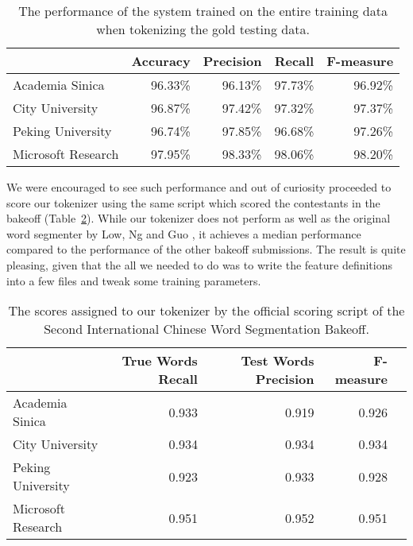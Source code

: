 \begin{table}
  \begin{center}
    \begin{tabular}{ | l | r | r | r | r | }
      \hline
      & Accuracy & Precision & Recall & F-measure \\ \hline
      Academia Sinica & 96.33\% & 96.13\% & 97.73\% & 96.92\% \\ \hline
      City University & 96.87\% & 97.42\% & 97.32\% & 97.37\% \\ \hline
      Peking University & 96.74\% & 97.85\% & 96.68\% & 97.26\% \\ \hline
      Microsoft Research & 97.95\% & 98.33\% & 98.06\% & 98.20\% \\
      \hline
    \end{tabular}
  \end{center}
  \caption[Final performance of Chinese segmenter]
    {The performance of the system trained on the entire training data when
     tokenizing the gold testing data.}
  \label{tbl:bakeoff-final}
\end{table}


We were encouraged to see such performance and out of curiosity proceeded to
score our tokenizer using the same script which scored the contestants in the
bakeoff (Table~\ref{tbl:bakeoff-score}). While our tokenizer does not perform
as well as the original word segmenter by Low, Ng and Guo
\cite{seg-chinese-maxent}, it achieves a median performance compared to the
performance of the other bakeoff submissions. The result is quite pleasing,
given that the all we needed to do was to write the feature definitions into a
few files and tweak some training parameters.

\begin{table}
  \begin{center}
    \begin{tabular}{ | l | r | r | r | r | }
      \hline
      & True Words Recall & Test Words Precision & F-measure \\ \hline
      Academia Sinica & 0.933 & 0.919 & 0.926 \\ \hline
      City University & 0.934 & 0.934 & 0.934 \\ \hline
      Peking University & 0.923 & 0.933 & 0.928 \\ \hline
      Microsoft Research & 0.951 & 0.952 & 0.951 \\
      \hline
    \end{tabular}
  \end{center}
  \caption[Chinese Word Segmentation scores]
    {The scores assigned to our tokenizer by the official scoring script of the
    Second International Chinese Word Segmentation Bakeoff.}
  \label{tbl:bakeoff-score}
\end{table}


